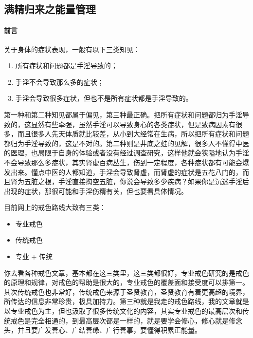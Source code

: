 \subsection{满精归来之能量管理}

\paragraph*{前言}

关于身体的症状表现，一般有以下三类知见：

\begin{enumerate}
    \item 所有症状和问题都是手淫导致的；
    \item 手淫不会导致那么多的症状；
    \item 手淫会导致很多症状，但也不是所有症状都是手淫导致的。
\end{enumerate}

第一种和第二种知见都属于偏见，第三种最正确。把所有症状和问题都归为手淫导致的，这显然有些牵强，虽然手淫可以导致身心的各类症状，但是致病因素有很多，而且很多人先天体质就比较差，从小到大经常在生病，所以把所有症状和问题都归为手淫导致的，这是不对的。第二种则是井底之蛙的见解，很多人不懂得中医的医理，也局限于自身的体验或者没有经过调查研究，这样他就会狭隘地认为手淫不会导致那么多症状，其实肾虚百病丛生，伤到一定程度，各种症状都有可能会爆发出来。懂点中医的人都知道，手淫会导致肾虚，而肾虚的症状是五花八门的，而且肾为五脏之根，手淫直接掏空五脏，你说会导致多少疾病？如果你是沉迷手淫后出现的症状，那很可能和手淫伤精有关，但也要看具体情况。

目前网上的戒色路线大致有三类：

\begin{multicols}{3}
    \begin{itemize}
        \item 专业戒色
        \item 传统戒色
        \item 专业 + 传统
    \end{itemize}
\end{multicols}

你去看各种戒色文章，基本都在这三类里，这三类都很好，专业戒色研究的是戒色的原理和规律，对戒色的帮助是很大的，专业戒色的覆盖面和接受度可以排第一。其次传统戒色也非常好，传统戒色来源于圣贤教育，圣贤教育有着更高超的境界，所传达的信息非常珍贵，极具加持力。第三种就是我走的戒色路线，我的文章就是以专业戒色为主，但也汲取了很多传统文化的内容，其实专业戒色的最高层次和传统戒色是完全相通的，到最高层次都是一样的，就是要学会修心，修心就是修念头，并且要广发善心、广结善缘、广行善事，要懂得积累正能量。

